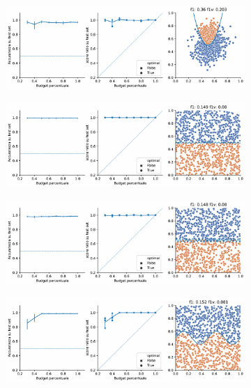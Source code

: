 \begin{appendices}
\begin{figure}[b!]
\end{figure}
\begin{figure}[ht]\ContinuedFloat
    \centering
    \begin{subfigure}{.8\textwidth}
        \centering
        \includegraphics[width=\textwidth]{img/2d/5.pdf}
    \end{subfigure}%
    \hfill
    \begin{subfigure}{.8\textwidth}
        \centering
        \includegraphics[width=\textwidth]{img/2d/6.pdf}
    \end{subfigure}%
    \hfill
    \begin{subfigure}{.8\textwidth}
        \centering
        \includegraphics[width=\textwidth]{img/2d/7.pdf}
    \end{subfigure}%
    \hfill
    \begin{subfigure}{.8\textwidth}
        \centering
        \includegraphics[width=\textwidth]{img/2d/11.pdf}

\end{subfigure}
\end{figure}
\end{appendices}
